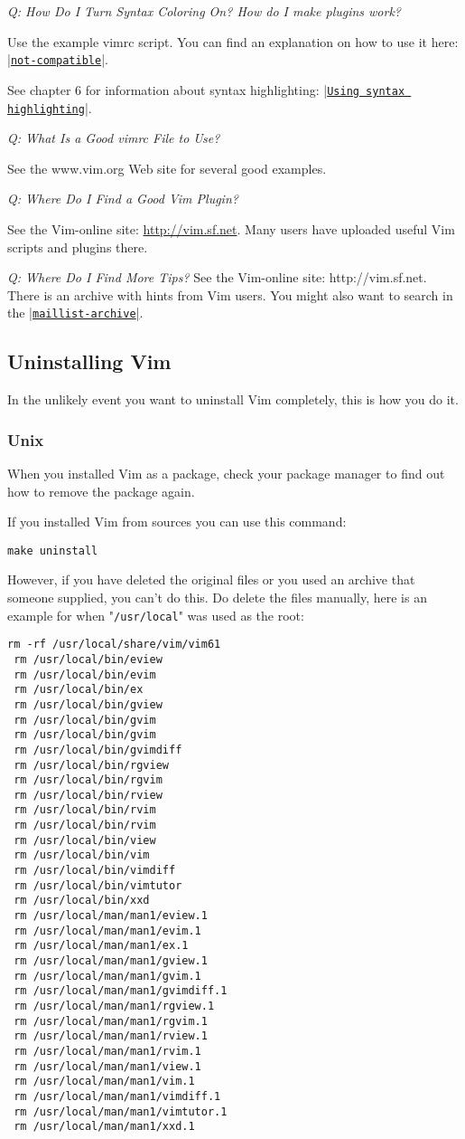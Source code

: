 \textit{Q: How Do I Turn Syntax Coloring On?  How do I make plugins work?}

Use the example vimrc script.
You can find an explanation on how to use it here: \hyperref[not-compatible]{|\texttt{not-compatible}|}.

See chapter 6 for information about syntax highlighting: |\hyperref[Using syntax highlighting]{\texttt{Using syntax highlighting}}|.

\textit{Q: What Is a Good vimrc File to Use?}

See the www.vim.org Web site for several good examples.

\textit{Q: Where Do I Find a Good Vim Plugin?}

See the Vim-online site: \url{http://vim.sf.net}.
Many users have uploaded useful Vim scripts and plugins there.

\textit{Q: Where Do I Find More Tips?}
See the Vim-online site:   http://vim.sf.net. There is an archive with hints from Vim users.
You might also want to search in the \hyperref[maillist-archive]{|\texttt{maillist-archive}|}.
\subsection{Uninstalling Vim}
\label{Uninstalling Vim}
In the unlikely event you want to uninstall Vim completely, this is how you do it.
\subsubsection{Unix}
When you installed Vim as a package, check your package manager to find out how to remove the package again.

If you installed Vim from sources you can use this command:

\begin{Verbatim}[samepage=true]
 make uninstall
\end{Verbatim}

However, if you have deleted the original files or you used an archive that someone supplied, you can't do this.
Do delete the files manually, here is an example for when "\verb!/usr/local!" was used as the root:

\begin{Verbatim}[samepage=true]
 rm -rf /usr/local/share/vim/vim61
 rm /usr/local/bin/eview
 rm /usr/local/bin/evim
 rm /usr/local/bin/ex
 rm /usr/local/bin/gview
 rm /usr/local/bin/gvim
 rm /usr/local/bin/gvim
 rm /usr/local/bin/gvimdiff
 rm /usr/local/bin/rgview
 rm /usr/local/bin/rgvim
 rm /usr/local/bin/rview
 rm /usr/local/bin/rvim
 rm /usr/local/bin/rvim
 rm /usr/local/bin/view
 rm /usr/local/bin/vim
 rm /usr/local/bin/vimdiff
 rm /usr/local/bin/vimtutor
 rm /usr/local/bin/xxd
 rm /usr/local/man/man1/eview.1
 rm /usr/local/man/man1/evim.1
 rm /usr/local/man/man1/ex.1
 rm /usr/local/man/man1/gview.1
 rm /usr/local/man/man1/gvim.1
 rm /usr/local/man/man1/gvimdiff.1
 rm /usr/local/man/man1/rgview.1
 rm /usr/local/man/man1/rgvim.1
 rm /usr/local/man/man1/rview.1
 rm /usr/local/man/man1/rvim.1
 rm /usr/local/man/man1/view.1
 rm /usr/local/man/man1/vim.1
 rm /usr/local/man/man1/vimdiff.1
 rm /usr/local/man/man1/vimtutor.1
 rm /usr/local/man/man1/xxd.1
\end{Verbatim}

